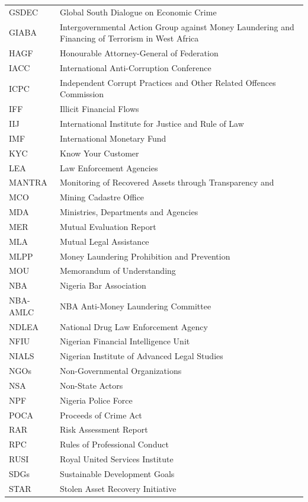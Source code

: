 \documentclass[
  letterpaper,
  DIV=11,
  numbers=noendperiod]{scrreprt}
\begin{document}
\begin{longtable}[]{@{}
  >{\raggedright\arraybackslash}p{}
  >{\raggedright\arraybackslash}p{}@{}}
GSDEC & Global South Dialogue on Economic Crime \\
GIABA & Intergovernmental Action Group against Money Laundering and
Financing of Terrorism in West Africa \\
HAGF & Honourable Attorney-General of Federation \\
IACC & International Anti-Corruption Conference \\
ICPC & Independent Corrupt Practices and Other Related Offences
Commission \\
IFF & Illicit Financial Flows \\
IIJ & International Institute for Justice and Rule of Law \\
IMF & International Monetary Fund \\
KYC & Know Your Customer \\
LEA & Law Enforcement Agencies \\
MANTRA & Monitoring of Recovered Assets through Transparency and \\
MCO & Mining Cadastre Office \\
MDA & Ministries, Departments and Agencies \\
MER & Mutual Evaluation Report \\
MLA & Mutual Legal Assistance \\
MLPP & Money Laundering Prohibition and Prevention \\
MOU & Memorandum of Understanding \\
NBA & Nigeria Bar Association \\
NBA-AMLC & NBA Anti-Money Laundering Committee \\
NDLEA & National Drug Law Enforcement Agency \\
NFIU & Nigerian Financial Intelligence Unit \\
NIALS & Nigerian Institute of Advanced Legal Studies \\
NGOs & Non-Governmental Organizations \\
NSA & Non-State Actors \\
NPF & Nigeria Police Force \\
POCA & Proceeds of Crime Act \\
RAR & Risk Assessment Report \\
RPC & Rules of Professional Conduct \\
RUSI & Royal United Services Institute \\
SDGs & Sustainable Development Goals \\
STAR & Stolen Asset Recovery Initiative \\

\end{longtable}
\end{document}
